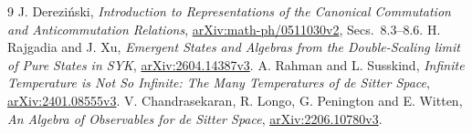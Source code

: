 \documentclass[11pt]{article}
\begin{document}
\begin{thebibliography}{9}
 J. Derezi\'nski,
\emph{Introduction to Representations of the Canonical Commutation
and Anticommutation Relations},
\href{https://arxiv.org/abs/math-ph/0511030v2}{arXiv:math-ph/0511030v2},
Secs.~8.3--8.6.
 H. Rajgadia and J. Xu,
\emph{Emergent States and Algebras from the Double-Scaling limit of
Pure States in SYK},
\href{https://arxiv.org/abs/2604.14387v3}{arXiv:2604.14387v3}.
 A. Rahman and L. Susskind,
\emph{Infinite Temperature is Not So Infinite: The Many Temperatures
of de Sitter Space},
\href{https://arxiv.org/abs/2401.08555v3}{arXiv:2401.08555v3}.
 V. Chandrasekaran, R. Longo, G. Penington and E. Witten,
\emph{An Algebra of Observables for de Sitter Space},
\href{https://arxiv.org/abs/2206.10780v3}{arXiv:2206.10780v3}.
\end{thebibliography}
\end{document}
